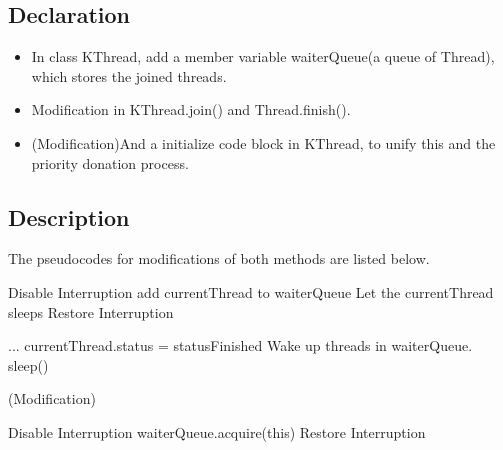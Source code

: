 \documentclass{article}
\begin{document}
	\subsection{Declaration}
	\begin{itemize}
		\item In class KThread, add a member variable waiterQueue(a queue of Thread), which stores the joined threads.
		
		\item Modification in KThread.join() and Thread.finish(). 
		
		\item (Modification)And a initialize code block in KThread, to unify this and the priority donation process.
    \end{itemize}
	
	\subsection{Description}
	
	The pseudocodes for modifications of both methods are listed below.
	
	\begin{algorithm}[H]
		\begin{algorithmic}
   				\State Disable Interruption
					\State add currentThread to waiterQueue
					\State Let the currentThread sleeps
				\EndIf
				\State Restore Interruption
			\EndProcedure
		\end{algorithmic}
	\end{algorithm}
	
	\begin{algorithm}[H]
		\begin{algorithmic}
			\Procedure {finish()}{}
				\State ...
				\State currentThread.status = statusFinished
				\State Wake up threads in waiterQueue.
				\State sleep()
			\EndProcedure
		\end{algorithmic}
	\end{algorithm}
	
	(Modification)
	\begin{algorithm}[H]
		\begin{algorithmic}
			\Procedure {Init}{}
			\State Disable Interruption
			\State waiterQueue.acquire(this)
			\State Restore Interruption
			\EndProcedure
		\end{algorithmic}
	\end{algorithm}
	
\end{document}

